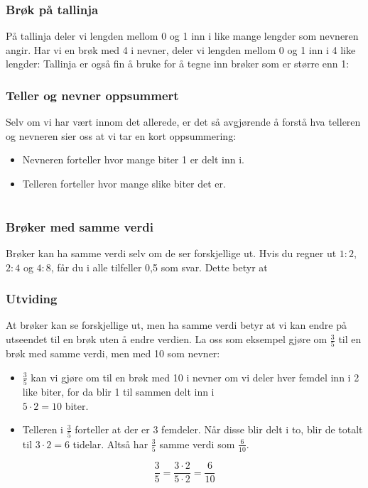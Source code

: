 \st{ \vs
{}
}

\newpage
\subsubsection{Brøk på tallinja}
På tallinja deler vi lengden mellom 0 og 1 inn i like mange lengder som nevneren angir. Har vi en brøk med 4 i nevner, deler vi lengden mellom 0 og 1 inn i 4 like lengder:
Tallinja er også fin å bruke for å tegne inn brøker som er større enn 1:
\subsubsection{Teller og nevner oppsummert}
Selv om vi har vært innom det allerede, er det så avgjørende å forstå hva telleren og nevneren sier oss at vi tar en kort oppsummering:
\begin{itemize}
	\item Nevneren forteller hvor mange biter 1 er delt inn i.
	\item Telleren forteller hvor mange slike biter det er.
\end{itemize}
\newpage
\section{\brvu}
\subsubsection{Brøker med samme verdi}
Brøker kan ha samme verdi selv om de ser forskjellige ut. Hvis du regner ut $ 1:2 $, $ 2:4 $ og $ 4:8 $, får du i alle tilfeller 0,5 som svar. Dette betyr at
 \\[5pt]
 \vsk
{}
\subsubsection{Utviding}
At brøker kan se forskjellige ut, men ha samme verdi betyr at vi kan endre på utseendet til en brøk uten å endre verdien. La oss som eksempel gjøre om $ \frac{3}{5} $ til en brøk med samme verdi, men med 10 som nevner:
\begin{itemize}
	\item $ \frac{3}{5} $ kan vi gjøre om til en brøk med 10 i nevner om vi deler hver femdel inn i 2 like biter, for da blir 1 til sammen delt inn i\\ $ {5\cdot2=10} $ biter.
	\item Telleren i $ \frac{3}{5} $ forteller at der er 3 femdeler. Når disse blir delt i to, blir de totalt til $ 3\cdot2=6 $ tidelar. Altså har $ \frac{3}{5} $ samme verdi som $ \frac{6}{10} $.
\end{itemize}
\[ \frac{3}{5}=\frac{3\cdot2}{5\cdot2}=\frac{6}{10} \]

